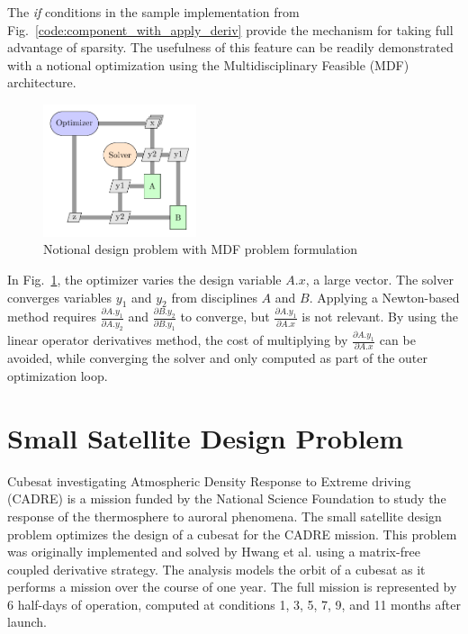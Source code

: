 \documentclass[]{aiaa-tc} %
\begin{document}
    The \textit{if} conditions in the sample implementation from Fig.~\ref{code:component_with_apply_deriv} provide the
    mechanism for taking full advantage of sparsity. The usefulness of this feature can be readily demonstrated with
    a notional optimization using the Multidisciplinary Feasible (MDF) architecture\cite{martins:arch:survey}.

    \begin{figure}[htbp]
        \centering
        \includegraphics[width=0.4\textwidth]{xdsm/mdf_sample}
        \caption{Notional design problem with MDF problem formulation}
        \label{fig:MDF:XDSM}
    \end{figure}

    In Fig.~\ref{fig:MDF:XDSM}, the optimizer varies the design variable $A.x$, a large vector.
    The solver converges variables $y_1$ and $y_2$ from disciplines $A$ and $B$. Applying a
    Newton-based method requires $\frac{\partial A.y_1}{\partial A.y_2}$ and $\frac{\partial B.y_2}{\partial B.y_1}$
    to converge, but $\frac{\partial A.y_1}{\partial A.x}$ is not relevant. By using the linear operator derivatives method,
    the cost of multiplying by $\frac{\partial A.y_1}{\partial A.x}$ can be avoided, while converging the solver and only
    computed as part of the outer optimization loop.

    \section{Small Satellite Design Problem}

    Cubesat investigating Atmospheric Density Response to Extreme driving (CADRE)
    is a mission funded by the National Science Foundation to study the
    response of the thermosphere to auroral phenomena\cite{cutler2011cubesat}.
    The small satellite design problem optimizes the design of a cubesat for the CADRE mission.
    This problem was originally implemented and solved by Hwang et al.\cite{CADRE2014} using
    a matrix-free coupled derivative strategy. The analysis models the orbit of a cubesat
    as it performs a mission over the course of one year. The full mission is represented
    by 6 half-days of operation, computed at conditions 1, 3, 5, 7, 9, and 11 months after launch.
\end{document}
